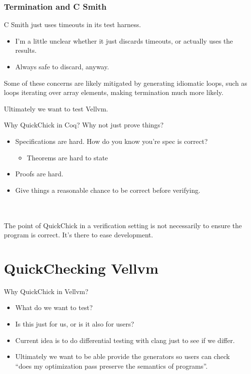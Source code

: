\documentclass{beamer}
\begin{document}
\begin{frame}
  \frametitle{Termination and C Smith}

  C Smith just uses timeouts in its test harness.

  \begin{itemize}
  \item I'm a little unclear whether it just discards timeouts, or
    actually uses the results.
  \item Always safe to discard, anyway.
  \end{itemize}

  Some of these concerns are likely mitigated by generating idiomatic
  loops, such as loops iterating over array elements, making
  termination much more likely.
\end{frame}
\begin{frame}
  Ultimately we want to test Vellvm.
\end{frame}

\begin{frame}
  Why QuickChick in Coq? Why not just prove things?

  \begin{itemize}
  \item Specifications are hard. How do you know you're spec is
    correct?
    \begin{itemize}
    \item Theorems are hard to state
    \end{itemize}
  \item Proofs are hard.
  \item Give things a reasonable chance to be correct before verifying.
  \end{itemize}~\\~\\
  The point of QuickChick in a verification setting is not necessarily
  to ensure the program is correct. It's there to ease development.
\end{frame}

\section{QuickChecking Vellvm}

\begin{frame}
  Why QuickChick in Vellvm?

  \begin{itemize}
  \item What do we want to test?
  \item Is this just for us, or is it also for users?
  \item Current idea is to do differential testing with clang just to
    see if we differ.
  \item Ultimately we want to be able provide the generators so users
    can check ``does my optimization pass preserve the semantics of programs''.
  \end{itemize}
\end{frame}
\end{document}
